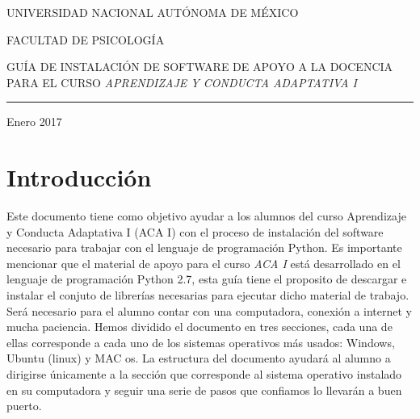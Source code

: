 \documentclass[a4paper, openright, 12pt]{article}
\author{Grupo de trabajo PAPIME}
\date{ENERO 2017}
\begin{document}
\begin{titlepage}

    \begin{center}
        \vspace{-1in}
        \vspace{0.35in}

        \begin{large}
            UNIVERSIDAD NACIONAL AUTÓNOMA DE MÉXICO
            \vspace{0.75in}

            FACULTAD DE PSICOLOGÍA
            \vspace{0.95in}

            GUÍA DE INSTALACIÓN DE SOFTWARE DE APOYO A LA DOCENCIA PARA EL CURSO \textit{APRENDIZAJE Y CONDUCTA ADAPTATIVA I}

            \vspace{4.5in}
            \rule{110mm}{0.02mm}


            \vspace{0.25in}
            Enero 2017
        \end{large}


    \end{center}

\end{titlepage}


\tableofcontents
\newpage{}

\section{Introducción}
    Este documento tiene como objetivo ayudar a los alumnos del curso Aprendizaje y Conducta Adaptativa I (ACA I) con el proceso de instalación del software necesario para trabajar con el lenguaje de programación Python. Es importante mencionar que el material de apoyo para el curso \textit{ACA I} está desarrollado en el lenguaje de programación Python 2.7, esta guía tiene el proposito de descargar e instalar el conjuto de librerías necesarias para ejecutar dicho material de trabajo.\\

    Será necesario para el alumno contar con una computadora, conexión a internet y mucha paciencia. Hemos dividido el documento en tres secciones, cada una de ellas corresponde a cada uno de los sistemas operativos más usados: Windows, Ubuntu (linux) y MAC os. La estructura del documento ayudará al alumno a dirigirse únicamente a la sección que corresponde al sistema operativo instalado en su computadora y seguir una serie de pasos que confiamos lo llevarán a buen puerto.\\
\end{document}
